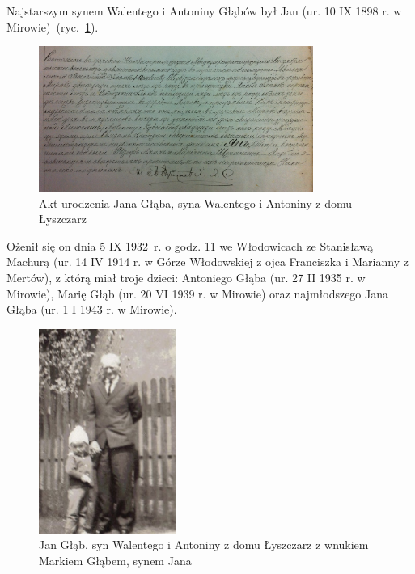 Najstarszym synem Walentego i Antoniny Głąbów był Jan (ur. 10 IX 1898 r. w Mirowie)~(ryc.~\ref{rys:akt_urodzenia_jana_glaba}).

\begin{figure}[!h]
\begin{center}
\includegraphics[width=0.8\textwidth]{zdjecia/akt_urodzenia_jana_glaba.jpg}
\caption[Akt urodzenia Jana Głąba]{Akt urodzenia Jana Głąba, syna Walentego i Antoniny z domu Łyszczarz}
\label{rys:akt_urodzenia_jana_glaba}
\end{center}
\end{figure}

Ożenił się on dnia 5 IX 1932~r. o godz. 11 we Włodowicach ze Stanisławą Machurą (ur. 14 IV 1914 r. w Górze Włodowskiej z ojca Franciszka i Marianny z Mertów), z którą miał troje dzieci: Antoniego Głąba (ur. 27 II 1935 r. w Mirowie), Marię Głąb (ur. 20 VI 1939 r. w Mirowie) oraz najmłodszego Jana Głąba (ur. 1 I 1943 r. w Mirowie).

\begin{figure}[!h]
\begin{center}
\includegraphics[width=0.4\textwidth]{zdjecia/jan_glab.jpg}
\caption[Jan Głąb z wnukiem Markiem Głąbem]{Jan Głąb, syn Walentego i Antoniny z domu Łyszczarz z wnukiem Markiem Głąbem, synem Jana}
\label{rys:jan_glab}
\end{center}
\end{figure}





